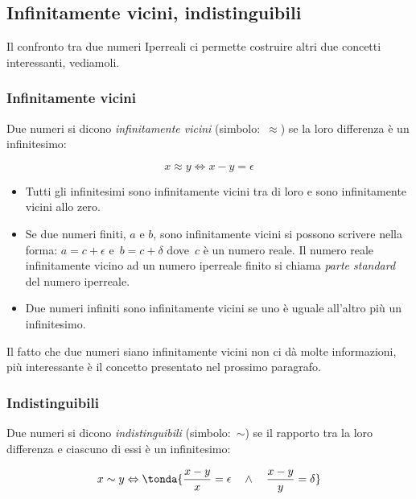 \subsection{Infinitamente vicini, indistinguibili}
\label{subsec:insnum_infvicindist}

Il confronto tra due numeri Iperreali ci permette costruire altri due concetti 
interessanti, vediamoli. 

\subsubsection{Infinitamente vicini}
\label{subsec:insnum_infinitamentevicini}

\begin{definizione}
Due numeri si dicono \emph{infinitamente vicini} (simbolo:~$\approx$) se 
la loro differenza è un infinitesimo: 

\[x \approx y \Leftrightarrow x - y = \epsilon\]

\end{definizione}

\begin{itemize} [noitemsep]
 \item 
Tutti gli infinitesimi sono infinitamente vicini tra di loro e sono 
infinitamente vicini allo zero.
 \item
Se due numeri finiti, $a$ e $b$, sono infinitamente vicini si possono 
scrivere nella forma: $a = c + \epsilon$ e~$b = c + \delta$ dove~$c$ è un 
numero reale. Il numero reale infinitamente vicino ad un numero iperreale 
finito si chiama \emph{parte standard} del numero iperreale.
 \item
Due numeri infiniti sono infinitamente vicini se uno è uguale all'altro più un 
infinitesimo.
\end{itemize}

Il fatto che due numeri siano infinitamente vicini non ci dà molte 
informazioni, più interessante è il concetto presentato nel prossimo paragrafo.

\subsubsection{Indistinguibili}
\label{subsec:insnum_indistinguibili}

\begin{definizione}
Due numeri si dicono \emph{indistinguibili} (simbolo:~$\sim$) se il 
rapporto tra la loro differenza e ciascuno di essi è un infinitesimo:

\[x \sim y \Leftrightarrow 
\tonda{\frac{x-y}{x} = \epsilon \quad \wedge \quad \frac{x-y}{y} = \delta}
\]

\end{definizione}

